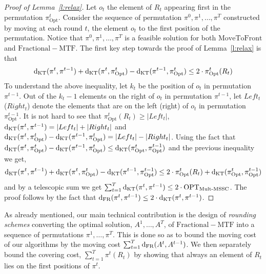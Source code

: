 \begin{proof}[Proof of Lemma~\ref{l:relax}]
Let $o_t$ the element of $R_t$ appearing first in the permutation $\pi_{\mathrm{Opt}}^t$. Consider the sequence of permutation $\pi^0,\pi^1,\ldots,\pi^T$ constructed by moving at each round $t$, the element $o_t$ to the first position of the permutation. Notice that $\pi^0,\pi^1,\ldots,\pi^T$ is a feasible solution for both $\mathrm{MoveToFront}$ and $\mathrm{Fractional}-\mathrm{MTF}$. The first key step towards the proof of Lemma~\ref{l:relax} is that
\[\mathrm{d}_{\mathrm{KT}}(\pi^t,\pi^{t-1}) + \mathrm{d}_{\mathrm{KT}}(\pi^t,\pi^t_{\mathrm{Opt}}) - 
\mathrm{d}_{\mathrm{KT}}(\pi^{t-1},\pi^{t}_{\mathrm{Opt}}) \leq 2\cdot \pi^t_{\mathrm{Opt}}(R_t)
\]
To understand the above inequality, let $k_t$ be the position of $o_t$ in permutation $\pi^{t-1}$. Out of the $k_t - 1$ elements on the right of $o_t$ in permutation $\pi^{t-1}$, let $Left_t$ ($Right_t$) denote the elements that are on the left (right) of $o_t$ in permutation $\pi^{t-1}_{\mathrm{Opt}}$. It is not hard to see that $\pi^t_{\mathrm{Opt}}(R_t) \geq |Left_t|$, $\mathrm{d}_{\mathrm{KT}}(\pi^t,\pi^{t-1}) = |Left_t| + |Right_t|$ and  
$\mathrm{d}_{\mathrm{KT}}(\pi^t,\pi^t_{\mathrm{Opt}}) - 
\mathrm{d}_{\mathrm{KT}}(\pi^{t-1},\pi^{t}_{\mathrm{Opt}}) = |Left_t| - |Right_t|$. Using the fact that $\mathrm{d}_{\mathrm{KT}}(\pi^{t},\pi^{t}_{\mathrm{Opt}}) - \mathrm{d}_{\mathrm{KT}}(\pi^{t-1},\pi^{t}_{\mathrm{Opt}}) \leq \mathrm{d}_{\mathrm{KT}}(\pi^{t}_{\mathrm{Opt}},\pi^{t-1}_{\mathrm{Opt}})$ and the previous inequality we get,
\[\mathrm{d}_{\mathrm{KT}}(\pi^t,\pi^{t-1}) + \mathrm{d}_{\mathrm{KT}}(\pi^t,\pi^t_{\mathrm{Opt}})-
\mathrm{d}_{\mathrm{KT}}(\pi^{t-1},\pi^{t-1}_{\mathrm{Opt}})
\leq 
 2 \cdot \pi^t_{\mathrm{Opt}}(R_t) + \mathrm{d}_{\mathrm{KT}}(\pi^{t}_{\mathrm{Opt}},\pi^{t-1}_{\mathrm{Opt}})
\]
\noindent and by a telescopic sum we get $\sum_{t=1}^T \mathrm{d}_{\mathrm{KT}}(\pi^t,\pi^{t-1}) \leq 2\cdot \mathrm{OPT}_{\mathrm{Mult}\text{-}\mathrm{MSSC}}$. The proof follows by the fact that $\mathrm{d}_{\mathrm{FR}}(\pi^t,\pi^{t-1}) \leq 2\cdot  \mathrm{d}_{\mathrm{KT}}(\pi^t,\pi^{t-1})$.
\end{proof}

As already mentioned, our main technical contribution is the design of \textit{rounding schemes} converting the optimal solution, $A^1,\ldots,A^T$, of $\mathrm{Fractional- MTF}$ into a sequence of permutations $\pi^1,\ldots,\pi^T$. This is done so as to bound the moving cost of our algorithms by the moving cost $\sum_{t=1}^T \mathrm{d}_{\mathrm{FR}}(A^t,A^{t-1})$. We then separately bound the covering cost, $\sum_{t=1}^T \pi^t(R_t)$ by showing that always an element of $R_t$ lies on the first positions of $\pi^t$.

